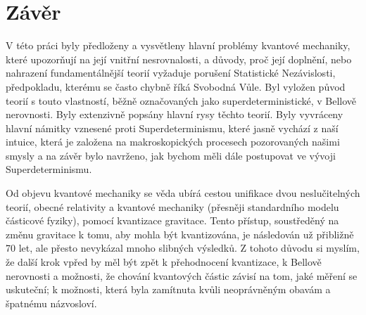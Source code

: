 \section*{Závěr}
\label{sec:conc}

V této práci byly předloženy a vysvětleny hlavní problémy kvantové mechaniky, které upozorňují na její vnitřní nesrovnalosti, a důvody, proč její doplnění, nebo nahrazení fundamentálnější teorií vyžaduje porušení Statistické Nezávislosti, předpokladu, kterému se často chybně říká Svobodná Vůle. Byl vyložen původ teorií s touto vlastností, běžně označovaných jako superdeterministické, v Bellově nerovnosti. Byly extenzivně popsány hlavní rysy těchto teorií. Byly vyvráceny hlavní námitky vznesené proti Superdeterminismu, které jasně vychází z naší intuice, která je založena na makroskopických procesech pozorovaných našimi smysly a na závěr bylo navrženo, jak bychom měli dále postupovat ve vývoji Superdeterminismu.

Od objevu kvantové mechaniky se věda ubírá cestou unifikace dvou neslučitelných teorií, obecné relativity a kvantové mechaniky (přesněji standardního modelu částicové fyziky), pomocí kvantizace gravitace. Tento přístup, soustředěný na změnu gravitace k tomu, aby mohla být kvantizována, je následován už přibližně 70 let, ale přesto nevykázal mnoho slibných výsledků. Z tohoto důvodu si myslím, že další krok vpřed by měl být zpět k přehodnocení kvantizace, k Bellově nerovnosti a možnosti, že chování kvantových částic závisí na tom, jaké měření se uskuteční; k možnosti, která byla zamítnuta kvůli neoprávněným obavám a špatnému názvosloví.
